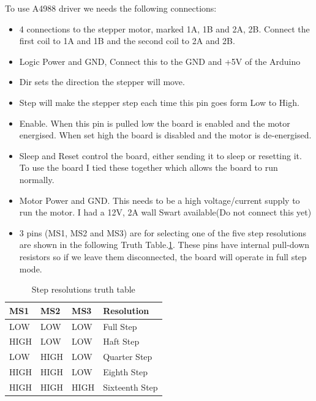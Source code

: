 To use A4988 driver we needs the following connections: 
\begin{itemize}
\item 4 connections to the stepper motor, marked 1A, 1B and 2A, 2B. Connect the first coil to 1A and 1B and the second coil to 2A and 2B.
\item Logic Power and GND, Connect this to the GND and +5V of the Arduino
\item Dir sets the direction the stepper will move.
\item Step will make the stepper step each time this pin goes form Low to High.
\item Enable. When this pin is pulled low the board is enabled and the motor energised. When set high the board is disabled and the motor is de-energised.
\item Sleep and Reset control the board, either sending it to sleep or resetting it. To use the board I tied these together which allows the board to run normally.
\item Motor Power and GND. This needs to be a high voltage/current supply to run the motor. I had a 12V, 2A wall Swart available(Do not connect this yet)
\item 3 pins (MS1, MS2 and MS3) are for selecting one of the five step resolutions are shown in the following Truth Table.\ref{tab:step_resolutions_truth_table}. These pins have internal pull-down resistors so if we leave them disconnected, the board will operate in full step mode.
\end{itemize}
\begin{table}[H]
\centering
\caption{Step resolutions truth table}
\label{tab:step_resolutions_truth_table}
\begin{tabular}{@{}llll@{}}
\toprule
\textbf{MS1} & \textbf{MS2} & \textbf{MS3} & \textbf{Resolution} \\ \midrule
LOW          & LOW          & LOW          & Full Step           \\
HIGH         & LOW          & LOW          & Haft Step           \\
LOW          & HIGH         & LOW          & Quarter Step        \\
HIGH         & HIGH         & LOW          & Eighth Step         \\
HIGH         & HIGH         & HIGH         & Sixteenth Step      \\ \bottomrule
\end{tabular}
\end{table}
